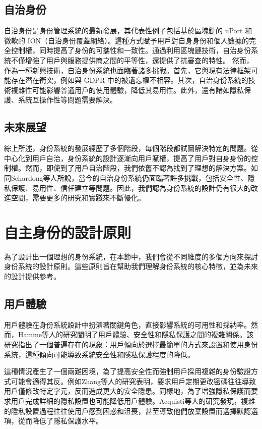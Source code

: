 \subsection{自治身份}
自治身份是身份管理系統的最新發展\cite{preukschat2021self}，其代表性例子包括基於區塊鏈的 uPort 和微軟的 ION（自治身份覆蓋網絡）\cite{lundkvist2017uport, microsoft2020ion}。這種方式賦予用戶對自身身份和個人數據的完全控制權，同時提高了身份的可攜性和一致性。通過利用區塊鏈技術，自治身份系統不僅增強了用戶與服務提供商之間的平等性，還提供了抗審查的特性。
然而，作為一種新興技術，自治身份系統也面臨著諸多挑戰\cite{s22155641}。首先，它與現有法律框架可能存在潛在衝突，例如與 GDPR 中的被遺忘權不相容\cite{finck2018blockchains}。其次，自治身份系統的技術複雜性可能影響普通用戶的使用體驗，降低其易用性\cite{kubach2020self}。此外，還有諸如隱私保護、系統互操作性等問題需要解決。
\subsection{未來展望}
綜上所述，身份系統的發展經歷了多個階段，每個階段都試圖解決特定的問題。從中心化到用戶自治，身份系統的設計逐漸向用戶賦權，提高了用戶對自身身份的控制權。然而，即使到了用戶自治階段，我們依舊不認為找到了理想的解決方案。如同Schardong等人\cite{s22155641,soltani2021surveydid}所說，當今的自治身份系統仍面臨著許多挑戰，包括安全性、隱私保護、易用性、信任建立等問題。因此，我們認為身份系統的設計仍有很大的改進空間，需要更多的研究和實踐來不斷優化。
\section{自主身份的設計原則}
為了設計出一個理想的身份系統，在本節中，我們會從不同維度的多個方向來探討身份系統的設計原則。這些原則旨在幫助我們理解身份系統的核心特徵，並為未來的設計提供參考。
\subsection{用戶體驗}
用戶體驗在身份系統設計中扮演著關鍵角色，直接影響系統的可用性和採納率。然而，Hamme等人\cite{inproceedings}的研究闡明了用戶體驗、安全性和隱私保護之間的複雜關係。該研究指出了一個普遍存在的現象：用戶傾向於選擇最簡單的方式來設置和使用身份系統，這種傾向可能導致系統安全性和隱私保護程度的降低。

這種情況產生了一個兩難困境，為了提高安全性而強制用戶採用複雜的身份驗證方式可能會適得其反。例如Zhang等人\cite{zhang2010security}的研究表明，要求用戶定期更改密碼往往導致用戶僅修改特定字元，反而造成更大的安全隱患。同樣地，為了增強隱私保護而要求用戶完成詳細的隱私設置也可能降低用戶體驗。Acquisti等人\cite{acquisti2017nudges}的研究發現，複雜的隱私設置過程往往使用戶感到困惑和沮喪，甚至導致他們放棄設置而選擇默認選項，從而降低了隱私保護水平。

